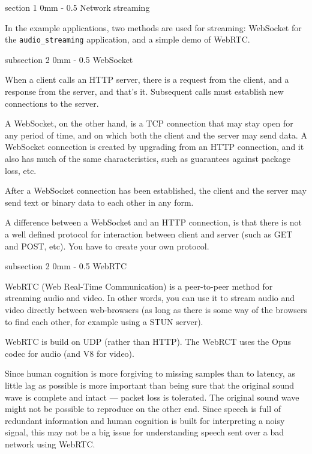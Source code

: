 \documentclass[11pt, a4paper, twoside]{article}
\makeatletter
\renewcommand{\subsection}{\@startsection
  {subsection}%
  {2}%
  {0mm}%
  {-\baselineskip}%
  {0.5\baselineskip}%
  {\bfseries\sffamily\large}}%
\renewcommand{\section}{\@startsection
  {section}%
  {1}%
  {0mm}%
  {-\baselineskip}%
  {0.5\baselineskip}%
  {\bfseries\sffamily\Large}}%
\makeatother
\begin{document}
\section{Network streaming}

In the example applications, two methods are used for streaming: WebSocket for the {\tt audio\_streaming} application, and a simple demo of WebRTC.

\subsection{WebSocket}

When a client calls an HTTP server, there is a request from the
client, and a response from the server, and that's it. Subsequent
calls must establish new connections to the server.

A WebSocket, on the other hand, is a TCP connection that may stay open
for any period of time, and on which both the client and the server
may send data. A WebSocket connection is created by upgrading from an
HTTP connection, and it also has much of the same characteristics,
such as guarantees against package loss, etc.

After a WebSocket connection has been established, the
client and the server may send text or binary data to each other in
any form.

A difference between a WebSocket and an HTTP connection, is that
there is not a well defined protocol for interaction between client
and server (such as GET and POST, etc). You have to create your own
protocol. 

\subsection{WebRTC}

WebRTC (Web Real-Time Communication) \cite{webrtc} is a peer-to-peer method for
streaming audio and video. In other words, you can use it to stream
audio and video directly between web-browsers (as long as there is
some way of the browsers to find each other, for example using a STUN
server).

WebRTC is build on UDP (rather than HTTP). The WebRCT uses the Opus
codec for audio (and V8 for video).

Since human cognition is more forgiving to missing samples than to
latency, as little lag as possible is more important than being sure
that the original sound wave is complete and intact --- packet loss is
tolerated. The original sound wave might not be possible to reproduce
on the other end. Since speech is full of redundant information and
human cognition is built for interpreting a noisy signal, this may not
be a big issue for understanding speech sent over a bad network using
WebRTC.
\end{document}
